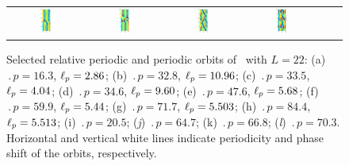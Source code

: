 \begin{figure}[t]
\begin{center}
\begin{tabular}{cccccc}
\includegraphics[width=0.15\textwidth]{figs/ks22rpo059.9-05.44.eps}\hspace{-3ex} &
\includegraphics[width=0.15\textwidth]{figs/ks22rpo084.4-05.51.eps}\hspace{-3ex} &
\includegraphics[width=0.15\textwidth]{figs/ks22rpo064.7-00.00.eps}\hspace{-3ex} &
\includegraphics[width=0.15\textwidth]{figs/ks22rpo070.3-00.00.eps}
\end{tabular}
\end{center}
\caption{Selected relative periodic and periodic orbits of \KSe\ with $L = 22$:
(a) $\period{p} = 16.3$, $\ell_p = 2.86$;
(b) $\period{p} = 32.8$, $\ell_p = 10.96$;
(c) $\period{p} = 33.5$, $\ell_p = 4.04$;
(d) $\period{p} = 34.6$, $\ell_p = 9.60$;
(e) $\period{p} = 47.6$, $\ell_p = 5.68$;
(f) $\period{p} = 59.9$, $\ell_p = 5.44$;
(g) $\period{p} = 71.7$, $\ell_p = 5.503$;
(h) $\period{p} = 84.4$, $\ell_p = 5.513$;
(i) $\period{p} = 20.5$;  (\textit{j}) $\period{p} = 64.7$;
(k) $\period{p} = 66.8$;  (\textit{l}) $\period{p} = 70.3$.
Horizontal and vertical white lines indicate periodicity and phase
shift of the orbits, respectively.
}\label{f:ks22rpos}
\end{figure}

